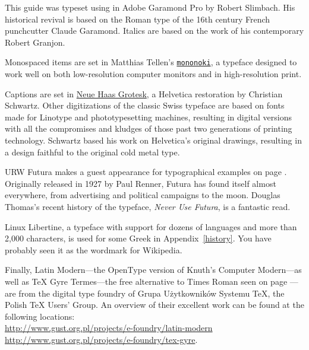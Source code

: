 This guide was typeset using \LuaLaTeX{} in Adobe Garamond Pro by
Robert Slimbach.
His historical revival is based on the Roman type of
the 16{th} century French
punchcutter Claude Garamond.
Italics are based on the work of his contemporary Robert Granjon.

Monospaced items are set in Matthias Tellen's
\href{https://madmalik.github.io/mononoki/}{\texttt{mononoki}},
a typeface designed to work well on both low-resolution computer monitors
and in high-resolution print.

Captions are set in
\href{http://www.fontbureau.com/NHG/}{\textsf{\small Neue Haas Grotesk}},
a Helvetica restoration by Christian Schwartz.
Other digitizations of the classic Swiss typeface are based on fonts made for
Linotype and phototypesetting machines,
resulting in digital versions with all the compromises and kludges of those
past two generations of printing technology.
Schwartz based his work on Helvetica's original drawings,
resulting in a design faithful to the original cold metal type.

{URW Futura}
makes a guest appearance
for typographical examples on page \pageref{typography}.
Originally released in 1927 by Paul Renner,
Futura has found itself almost everywhere,
from advertising and political campaigns to the moon.
Douglas Thomas's recent history of the typeface,
\textit{Never Use Futura}, is a fantastic read.

{Linux Libertine},
a typeface with support for dozens of languages and more than 2,000 characters,
is used for some Greek in Appendix~\ref{history}.
You have probably seen it as the wordmark for Wikipedia.

Finally,
Latin Modern---the OpenType version of Knuth's Computer Modern---as well
as {\TeX{} Gyre Termes}---the
free alternative to Times Roman seen on page \pageref{typography}---are from
the digital type foundry of Grupa Użytkowników Systemu \TeX{},
the Polish \TeX{} Users' Group.
An overview of their excellent work can be found at the following locations:\\
\url{http://www.gust.org.pl/projects/e-foundry/latin-modern} \\
\url{http://www.gust.org.pl/projects/e-foundry/tex-gyre}.
